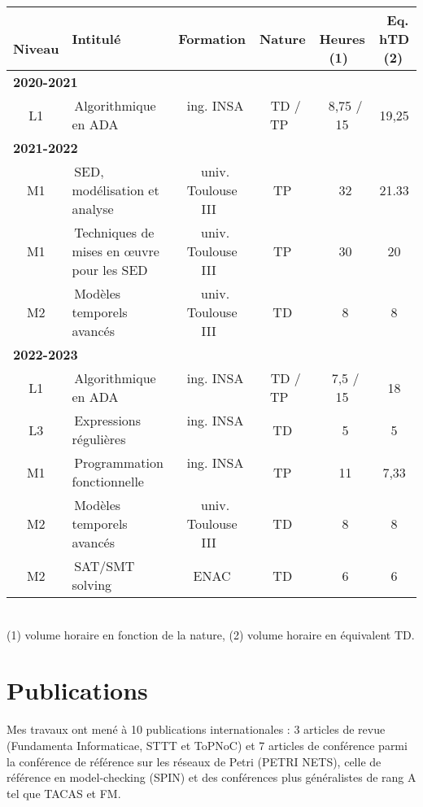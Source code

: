\documentclass[11pt,a4paper]{moderncv}
\begin{document}
{\small
\begin{tabular}{c @{\quad} p{13em} @{\qquad} c c c c}
\toprule
\, Niveau  & Intitulé &Formation& Nature &   \, Heures (1) \, & \, Eq. hTD (2)\,  \\
\midrule
\multicolumn{6}{l}{\textbf{2020-2021}}\\
\, L1 \,& \,Algorithmique en ADA \,&\, ing. INSA  \,&\,  TD / TP \,&\, 8,75 / 15 & 19,25\\
\midrule
\multicolumn{6}{l}{\textbf{2021-2022}}\\
\, M1 \,& \,SED, modélisation et analyse \,&\, univ. Toulouse III  \,&\,  TP \,&\, 32 & 21.33\\
\, M1 \,& \,Techniques de mises en œuvre pour les SED\,&\, univ. Toulouse III  \,&\,  TP \,&\, 30 & 20\\
\, M2 \,& \,Modèles temporels avancés \,&\, univ. Toulouse III  \,&\,  TD \,&\, 8 & 8\\
\midrule
\multicolumn{6}{l}{\textbf{2022-2023}}\\
\, L1 \,& \,Algorithmique en ADA \,&\, ing. INSA  \,&\,  TD / TP \,&\, 7,5 / 15 & 18\\
\, L3 \,& \,Expressions régulières \,&\, ing. INSA  \,&\,  TD \,&\, 5 & 5\\
\, M1 \,& \,Programmation fonctionnelle \,&\, ing. INSA  \,&\,  TP \,&\, 11 & 7,33\\
\, M2 \,& \,Modèles temporels avancés \,&\, univ. Toulouse III  \,&\,  TD \,&\, 8 & 8\\
\, M2 \,& \,SAT/SMT solving \,&\, ENAC \,&\,  TD \,&\, 6& 6\\
\bottomrule
\end{tabular}
}\\

(1) volume horaire en fonction de la nature, (2) volume horaire en équivalent TD.

\vspace{10pt}
\section*{Publications}
\vspace{10pt}

Mes travaux ont mené à 10 publications internationales : 3 articles de revue
(Fundamenta Informaticae, STTT et ToPNoC) et 7 articles de conférence parmi la
conférence de référence sur les réseaux de Petri (PETRI NETS), celle de
référence en model-checking (SPIN) et des conférences plus généralistes de rang
A tel que TACAS et FM.
\end{document}
